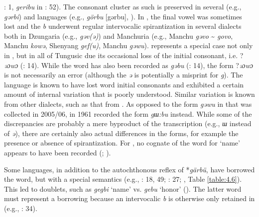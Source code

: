 \documentclass[output=paper,colorlinks,citecolor=brown]{langscibook}
\begin{document}
\citealt{Ivanovskiy1982}: 1,  \textit{geribu} in \citealt{Nakanome1928}: 52). The consonant cluster as such is preserved in several  (e.g.,  \textit{gərbi}) and  languages (e.g.,  \textit{görbu} [gərbu], \citealt{Schmidt1923a}). In , the final vowel was sometimes lost and the \textit{b} underwent regular intervocalic spirantization in several  dialects both in Dzungaria (e.g.,  \textit{gəv(ə)}) and Manchuria (e.g.,  Manchu \textit{gəvo} {\textasciitilde} \textit{govo},  Manchu \textit{kowə}, Shenyang  \textit{gef(u)},  Manchu \textit{gəwu}).  represents a special case not only in , but in all of Tungusic due its occasional loss of the initial consonant, i.e. ?\textit{əɔwɔ} (\citealt{MuYejun1986H}: 14). While the word has also been recorded as \textit{gəbu} (\citealt{MuYejun1987H}: 14), the form ?\textit{əɔwɔ} is not necessarily an error (although the \textit{ə} is potentially a misprint for \textit{g}). The language is known to have lost word initial consonants and exhibited a certain amount of internal variation that is poorly understood. Similar variation is known from other dialects, such as that from . As opposed to the form \textit{gəwu} in \citet{KimJuwon2008} that was collected in 2005/06, \citet{Enhebatu1995H} in 1961 recorded the form \textit{gɯ:bu} instead. While some of the discrepancies are probably a mere byproduct of the transcription (e.g., \textit{ɯ} instead of \textit{ə}), there are certainly also actual differences in the forms, for example the presence or absence of spirantization. For  , no cognate of the word for ‘name’ appears to have been recorded (\citealt{Hölzl2018b}; \citealt{HölzlHölzl2019a}).

Some languages, in addition to the autochthonous reflex of *\textit{gärbü}, have borrowed the  word, but with a special semantics (e.g., \citealt{Benzing1956}: 18, 49; \citealt{Alonso2011}: 27; , Table \ref{table:4.6}). This led to doublets, such as  \textit{gegbi} ‘name’ vs. \textit{gebu} ‘honor’ (\citealt{NikolaevaTolskaya2001}). The latter word must represent a borrowing because an intervocalic \textit{b} is otherwise only retained in  (e.g., \citealt{Benzing1956}: 34).
\end{document}
